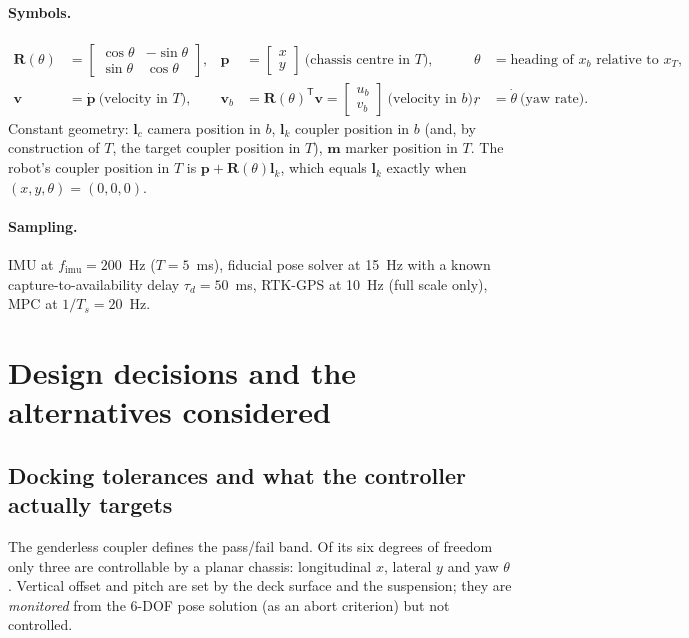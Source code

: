 \documentclass[11pt,a4paper]{article}
\newcommand{\vect}[1]{\bm{#1}}
\newcommand{\mat}[1]{\bm{#1}}
\newcommand{\T}{^{\mathsf{T}}}
\newcommand{\Rot}{\mat{R}}
\newcommand{\Ts}{T_s}
\begin{document}
\paragraph{Symbols.}
\begin{align}
\Rot(\theta) &= \begin{bmatrix}\cos\theta & -\sin\theta\\ \sin\theta & \cos\theta\end{bmatrix}, &
\vect{p} &= \begin{bmatrix} x \\ y \end{bmatrix} \ \text{(chassis centre in $T$)}, &
\theta &= \text{heading of } x_b \text{ relative to } x_T, \\
\vect{v} &= \dot{\vect{p}} \ \text{(velocity in $T$)}, &
\vect{v}_b &= \Rot(\theta)\T \vect{v} = \begin{bmatrix} u_b \\ v_b\end{bmatrix} \ \text{(velocity in $b$)}, &
r &= \dot\theta \ \text{(yaw rate)}.
\end{align}
Constant geometry: $\vect{l}_c$ camera position in $b$, $\vect{l}_k$ coupler position in $b$ (and, by construction of $T$, the target coupler position in $T$), $\vect{m}$ marker position in $T$. The robot's coupler position in $T$ is $\vect{p}+\Rot(\theta)\vect{l}_k$, which equals $\vect{l}_k$ exactly when $(x,y,\theta)=(0,0,0)$.

\paragraph{Sampling.} IMU at $f_{\mathrm{imu}}=200$~Hz ($T=5$~ms), fiducial pose solver at 15~Hz with a known capture-to-availability delay $\tau_d=50$~ms, RTK-GPS at 10~Hz (full scale only), MPC at $1/\Ts = 20$~Hz.

\section{Design decisions and the alternatives considered}
\label{sec:decisions}

\subsection{Docking tolerances and what the controller actually targets}
\label{sec:tol}

The genderless coupler defines the pass/fail band. Of its six degrees of freedom only three are controllable by a planar chassis: longitudinal $x$, lateral $y$ and yaw $\theta$. Vertical offset and pitch are set by the deck surface and the suspension; they are \emph{monitored} from the 6-DOF pose solution (as an abort criterion) but not controlled.
\end{document}
